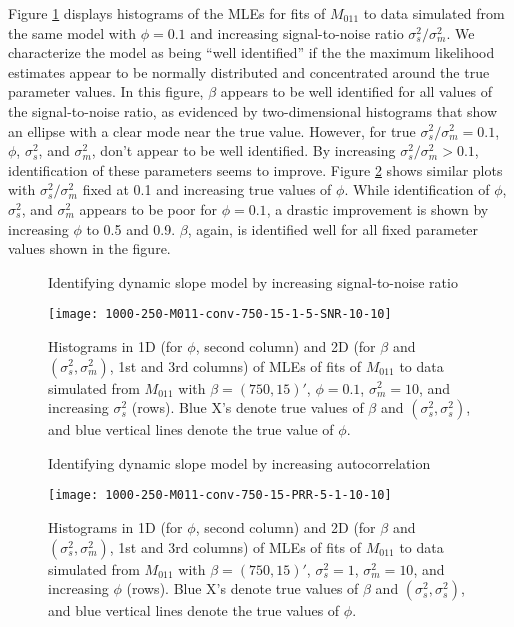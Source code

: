 Figure \ref{fig:fmri:id:M011SNR} displays histograms of the MLEs for fits of $M_{011}$ to data simulated from the same model with $\phi = 0.1$ and increasing signal-to-noise ratio $\sigma^2_s / \sigma^2_m$. We characterize the model as being ``well identified'' if the the maximum likelihood estimates appear to be normally distributed and concentrated around the true parameter values. In this figure, $\beta$ appears to be well identified for all values of the signal-to-noise ratio, as evidenced by two-dimensional histograms that show an ellipse with a clear mode near the true value. However, for true $\sigma^2_s / \sigma^2_m = 0.1$, $\phi$, $\sigma^2_s$, and $\sigma^2_m$, don't appear to be well identified. By increasing $\sigma^2_s / \sigma^2_m > 0.1$, identification of these parameters seems to improve. Figure \ref{fig:fmri:id:M011PRR} shows similar plots with $\sigma^2_s / \sigma^2_m$ fixed at 0.1 and increasing true values of $\phi$. While identification of $\phi$, $\sigma^2_s$, and $\sigma^2_m$ appears to be poor for $\phi = 0.1$, a drastic improvement is shown by increasing $\phi$ to 0.5 and 0.9. $\beta$, again, is identified well for all fixed parameter values shown in the figure.


\begin{figure}
\ssp
\centering
\caption{Identifying dynamic slope model by increasing signal-to-noise ratio} \label{fig:fmri:id:M011SNR}
\texttt{[image: 1000-250-M011-conv-750-15-1-5-SNR-10-10]}
\caption*{Histograms in 1D (for $\phi$, second column) and 2D (for $\beta$ and $(\sigma^2_s,\sigma^2_m)$, 1st and 3rd columns) of MLEs of fits of $M_{011}$ to data simulated from $M_{011}$ with $\beta = (750,15)'$, $\phi = 0.1$, $\sigma^2_m = 10$, and increasing $\sigma^2_s$ (rows). Blue X's denote true values of $\beta$ and $(\sigma^2_s,\sigma^2_s)$, and blue vertical lines denote the true value of $\phi$.}
\end{figure}

\begin{figure}
\ssp
\centering
\caption{Identifying dynamic slope model by increasing autocorrelation} \label{fig:fmri:id:M011PRR}
\texttt{[image: 1000-250-M011-conv-750-15-PRR-5-1-10-10]}
\caption*{Histograms in 1D (for $\phi$, second column) and 2D (for $\beta$ and $(\sigma^2_s,\sigma^2_m)$, 1st and 3rd columns) of MLEs of fits of $M_{011}$ to data simulated from $M_{011}$ with $\beta = (750,15)'$, $\sigma^2_s = 1$, $\sigma^2_m = 10$, and increasing $\phi$ (rows). Blue X's denote true values of $\beta$ and $(\sigma^2_s,\sigma^2_s)$, and blue vertical lines denote the true values of $\phi$.}
\end{figure}

